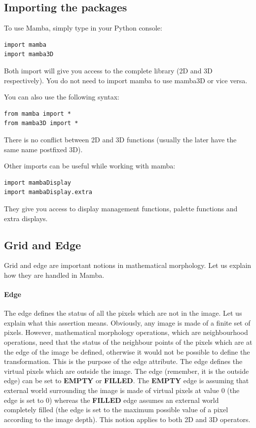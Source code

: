 \documentclass[a4paper,10pt,oneside]{article}
\begin{document}
\subsection{Importing the packages}

To use Mamba, simply type in your Python console:

\lstset{language=Python}
\begin{lstlisting}
import mamba
import mamba3D
\end{lstlisting}

Both import will give you access to the complete library (2D and 3D respectively).
You do not need to import mamba to use mamba3D or vice versa.

You can also use the following syntax:

\lstset{language=Python}
\begin{lstlisting}
from mamba import *
from mamba3D import *
\end{lstlisting}

There is no conflict between 2D and 3D functions (usually the later have the
same name postfixed 3D).

Other imports can be useful while working with mamba:

\lstset{language=Python}
\begin{lstlisting}
import mambaDisplay
import mambaDisplay.extra
\end{lstlisting}

They give you access to display management functions, palette functions and
extra displays.

\subsection{Grid and Edge}

Grid and edge are important notions in mathematical morphology. Let us explain
how they are handled in Mamba. 

\paragraph{Edge}

The edge defines the status of all the pixels which are not in the image. Let us 
explain what this assertion means. Obviously, any image is made of a finite set 
of pixels. However, mathematical morphology operations, which are neighbourhood 
operations, need that the status of the neighbour points of the pixels which are at 
the edge of the image be defined, otherwise it would not be possible to define the 
transformation. This is the purpose of the edge attribute. The edge defines the 
virtual pixels which are outside the image. The edge (remember, it is the outside 
edge) can be set to \textbf{EMPTY} or \textbf{FILLED}. The \textbf{EMPTY} edge
is assuming that external world surrounding 
the image is made of virtual pixels at value 0 (the edge is set to 0) whereas 
the \textbf{FILLED} edge assumes an external world completely filled 
(the edge is set to the maximum possible value of a pixel according to the image 
depth). This notion applies to both 2D and 3D operators.
\end{document}
